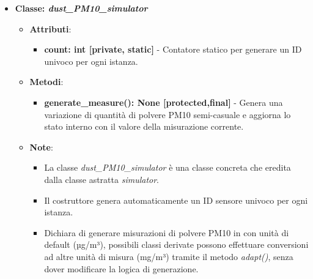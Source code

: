 \begin{itemize}
    \item{\textbf{Classe: \textit{dust\_PM10\_simulator}}}
    \begin{itemize}
        \item \textbf{Attributi}: 
        \begin{itemize}
            \item \textbf{count: int [private, static]} - Contatore statico per generare un ID univoco per ogni istanza.
        \end{itemize}
        \item \textbf{Metodi}: 
        \begin{itemize}
            \item \textbf{generate\_measure(): None [protected,final]} - Genera una variazione di quantità di polvere PM10 semi-casuale e aggiorna lo stato interno con il valore della misurazione corrente.
        \end{itemize}
        \item \textbf{Note}:
        \begin{itemize}
            \item La classe \textit{dust\_PM10\_simulator} è una classe concreta che eredita dalla classe astratta \textit{simulator}.
            \item Il costruttore genera automaticamente un ID sensore univoco per ogni istanza.
            \item Dichiara di generare misurazioni di polvere PM10 in con unità di default (µg/m³), possibili classi derivate possono effettuare conversioni ad altre unità di misura (mg/m³) tramite il metodo \textit{adapt()}, senza dover modificare la logica di generazione.
        \end{itemize}
    \end{itemize}


\end{itemize}
